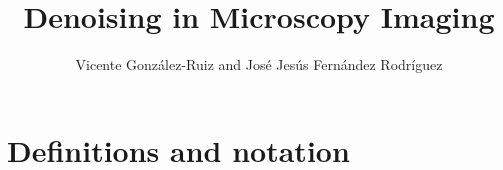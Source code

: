 \documentclass{report}%
\title{Denoising in Microscopy Imaging}
\author{Vicente González-Ruiz and José Jesús Fernández Rodríguez}
\begin{document}
\maketitle
\tableofcontents
\section*{Definitions and notation}

























\end{document}
